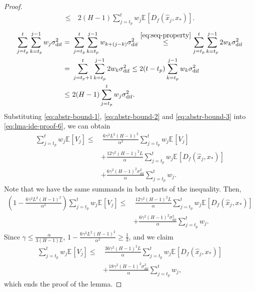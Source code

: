 \documentclass[sn-mathphys,Numbered]{sn-jnl}%
\renewcommand{\|}{\parallel}
\newcommand\ec[2][]{\ensuremath{\mathbb{E}_{#1} \left[#2\right]}}
\newcommand{\sigmaf}{\sigma_{\mathrm{dif}}}
\renewcommand {\*} {\ast}
\begin{document}
\begin{proof}
\begin{align}
       \leq&\ 2(H-1)\sum\limits_{j=t_p}^t w_{j} \ec{D_{f} (\hat{x}_j, x_\ast)}.
   \end{align}
   \begin{align}
       \label{eq:abstr-bound-3}
       \sum\limits_{j=t_p}^t \sum\limits_{k=t_p}^{j - 1}w_j \sigmaf^2 =&\  \sum\limits_{j=t_p}^t \sum\limits_{k=t_p}^{j - 1}w_{k + (j - k)} \sigmaf^2 \overset{\eqref{eq:seq-property}}{\leq} \sum\limits_{j=t_p}^t \sum\limits_{k=t_p}^{j - 1}2w_{k} \sigmaf^2 \nonumber \\ =&\ \sum\limits_{j=t_p + 1}^t \sum\limits_{k=t_p}^{j - 1}2w_{k} \sigmaf^2 \leq 2(t - t_p) \sum\limits_{k=t_p}^{j - 1}w_{k} \sigmaf^2 \nonumber \\
       \leq&\ 2(H-1)\sum\limits_{j=t_p}^t w_{j} \sigmaf^2.
   \end{align}
   Substituting \eqref{eq:abstr-bound-1}, \eqref{eq:abstr-bound-2} and \eqref{eq:abstr-bound-3} into \eqref{eq:lma-ide-proof-6}, we can obtain
   \begin{align*}
       \sum\limits_{j=t_p}^t w_j \ec{V_j} \leq&\ \frac{6\gamma^2L^2(H-1)^2}{\alpha^2} \sum\limits_{j=t_p}^t w_j  \ec{V_j} \nonumber \\
       &+  \frac{12\gamma^2(H-1)^2 L}{\alpha}\sum\limits_{j=t_p}^t w_j  \ec{D_{f} (\hat{x}_j, x_\ast)} \nonumber \\
       &+  \frac{6\gamma^2(H-1)^2  \sigmaf^2}{\alpha}\sum\limits_{j=t_p}^t w_j.
   \end{align*}
   Note that we have the same summands in both parts of the inequality. Then,
   \begin{align*}
       \left(1 - \frac{6\gamma^2L^2(H-1)^2}{\alpha^2}\right)\sum\limits_{j=t_p}^t w_j \ec{V_j} \leq&\  \frac{12\gamma^2(H-1)^2 L}{\alpha}\sum\limits_{j=t_p}^t w_j  \ec{D_{f} (\hat{x}_j, x_\ast)} \nonumber \\
       &+  \frac{6\gamma^2(H-1)^2  \sigmaf^2}{\alpha}\sum\limits_{j=t_p}^t w_j.
   \end{align*}
   Since $\gamma \leq \frac{\alpha}{3(H-1)L}$, $1 - \frac{6\gamma^2L^2(H-1)^2}{\alpha^2} \geq \frac{1}{3}$, and we claim
   \begin{align*}
       \sum\limits_{j=t_p}^t w_j \ec{V_j} \leq&\  \frac{36\gamma^2(H-1)^2 L}{\alpha}\sum\limits_{j=t_p}^t w_j  \ec{D_{f} (\hat{x}_j
       , x_\ast)} \nonumber \\
       &+  \frac{18\gamma^2(H-1)^2  \sigmaf^2}{\alpha}\sum\limits_{j=t_p}^t w_j,
   \end{align*}
   which ends the proof of the lemma.
\end{proof}
\end{document}

